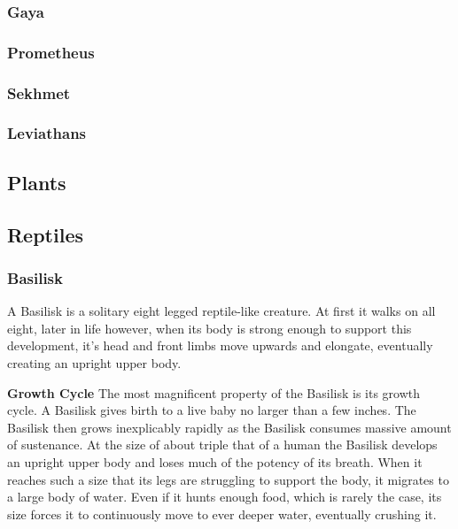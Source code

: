 \hypertarget{gaya}{%
\subsubsection{Gaya}\label{gaya}}

\hypertarget{prometheus}{%
\subsubsection{Prometheus}\label{prometheus}}

\hypertarget{sekhmet}{%
\subsubsection{Sekhmet}\label{sekhmet}}

\hypertarget{leviathans}{%
\subsubsection{Leviathans}\label{leviathans}}

\hypertarget{plants}{%
\subsection{Plants}\label{plants}}

\hypertarget{reptiles}{%
\subsection{Reptiles}\label{reptiles}}

\hypertarget{basilisk}{%
\subsubsection{Basilisk}\label{basilisk}}

A Basilisk is a solitary eight legged reptile-like creature. At first it
walks on all eight, later in life however, when its body is strong
enough to support this development, it's head and front limbs move
upwards and elongate, eventually creating an upright upper body.

\textbf{Growth Cycle} The most magnificent property of the Basilisk is
its growth cycle. A Basilisk gives birth to a live baby no larger than a
few inches. The Basilisk then grows inexplicably rapidly as the Basilisk
consumes massive amount of sustenance. At the size of about triple that
of a human the Basilisk develops an upright upper body and loses much of
the potency of its breath. When it reaches such a size that its legs are
struggling to support the body, it migrates to a large body of water.
Even if it hunts enough food, which is rarely the case, its size forces
it to continuously move to ever deeper water, eventually crushing it.

